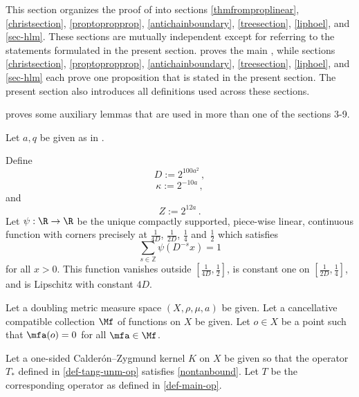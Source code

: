 This section organizes the proof of  into sections \ref{thmfromproplinear}, \ref{christsection}, \ref{proptopropprop}, \ref{antichainboundary}, \ref{treesection}, \ref{liphoel}, and \ref{sec-hlm}. These sections are mutually independent except for referring to the statements formulated in the present section.  proves the main , while sections \ref{christsection}, \ref{proptopropprop}, \ref{antichainboundary}, \ref{treesection}, \ref{liphoel}, and \ref{sec-hlm} each prove one proposition that is stated in the present section. The present section also introduces all definitions used across these sections.

 proves some auxiliary lemmas that are used in more than one of the sections 3-9.

Let $a, q$ be given as in .




Define
\begin{equation}\label{defineD}
D:= 2^{100 a^2}\, ,
\end{equation}
\begin{equation}\label{definekappa}
\kappa:= 2^{-10a}\,,
\end{equation}
and
\begin{equation}
    \label{defineZ}
    Z := 2^{12a}\,.
\end{equation}
Let
 $\psi:\R \to \R$ be the unique compactly supported, piece-wise linear, continuous function with corners precisely at $\frac 1{4D}$, $\frac 1{2D}$, $\frac 14$ and $\frac 12$ which satisfies
 \begin{equation}
    \label{eq-psisum}
    \sum_{s\in \mathbb{Z}} \psi(D^{-s}x)=1
\end{equation}
for all $x>0$. This function vanishes outside $[\frac1{4D},\frac 12]$, is constant one on
$[\frac1{2D},\frac 14]$, and is Lipschitz
with constant $4D$.







Let a doubling metric measure space $(X,\rho,\mu, a)$ be given.
Let a cancellative compatible collection $\Mf$ of functions on $X$ be given.
Let $o\in X$ be a point such that $\mfa(o)=0$
for all $\mfa\in \Mf$.







Let a one-sided Calder\'on--Zygmund kernel $K$ on $X$ be given so that the operator $T_*$ defined in \eqref{def-tang-unm-op}
satisfies
\eqref{nontanbound}. Let $T$ be the corresponding operator as defined in \eqref{def-main-op}.


